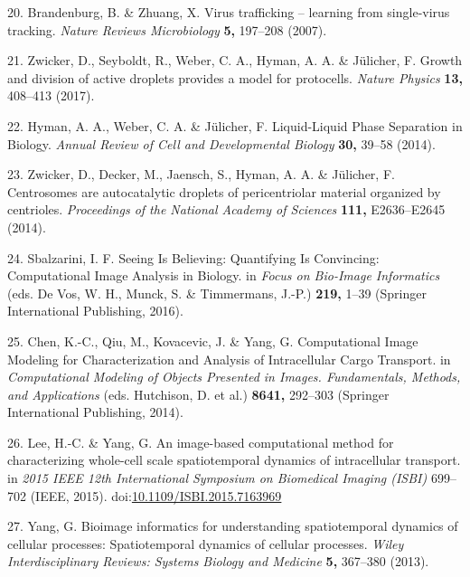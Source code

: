 \documentclass{Dissertate}
\begin{document}
\leavevmode\hypertarget{ref-brandenburg_virus_2007}{}%
20. Brandenburg, B. \& Zhuang, X. Virus trafficking -- learning from
single-virus tracking. \emph{Nature Reviews Microbiology} \textbf{5,}
197--208 (2007).

\leavevmode\hypertarget{ref-zwicker_growth_2017}{}%
21. Zwicker, D., Seyboldt, R., Weber, C. A., Hyman, A. A. \& Jülicher,
F. Growth and division of active droplets provides a model for
protocells. \emph{Nature Physics} \textbf{13,} 408--413 (2017).

\leavevmode\hypertarget{ref-hyman_liquid-liquid_2014}{}%
22. Hyman, A. A., Weber, C. A. \& Jülicher, F. Liquid-Liquid Phase
Separation in Biology. \emph{Annual Review of Cell and Developmental
Biology} \textbf{30,} 39--58 (2014).

\leavevmode\hypertarget{ref-zwicker_centrosomes_2014}{}%
23. Zwicker, D., Decker, M., Jaensch, S., Hyman, A. A. \& Jülicher, F.
Centrosomes are autocatalytic droplets of pericentriolar material
organized by centrioles. \emph{Proceedings of the National Academy of
Sciences} \textbf{111,} E2636--E2645 (2014).

\leavevmode\hypertarget{ref-de_vos_seeing_2016}{}%
24. Sbalzarini, I. F. Seeing Is Believing: Quantifying Is Convincing:
Computational Image Analysis in Biology. in \emph{Focus on Bio-Image
Informatics} (eds. De Vos, W. H., Munck, S. \& Timmermans, J.-P.)
\textbf{219,} 1--39 (Springer International Publishing, 2016).

\leavevmode\hypertarget{ref-hutchison_computational_2014}{}%
25. Chen, K.-C., Qiu, M., Kovacevic, J. \& Yang, G. Computational Image
Modeling for Characterization and Analysis of Intracellular Cargo
Transport. in \emph{Computational Modeling of Objects Presented in
Images. Fundamentals, Methods, and Applications} (eds. Hutchison, D. et
al.) \textbf{8641,} 292--303 (Springer International Publishing, 2014).

\leavevmode\hypertarget{ref-lee_image-based_2015}{}%
26. Lee, H.-C. \& Yang, G. An image-based computational method for
characterizing whole-cell scale spatiotemporal dynamics of intracellular
transport. in \emph{2015 IEEE 12th International Symposium on Biomedical
Imaging (ISBI)} 699--702 (IEEE, 2015).
doi:\href{https://doi.org/10.1109/ISBI.2015.7163969}{10.1109/ISBI.2015.7163969}

\leavevmode\hypertarget{ref-yang_bioimage_2013}{}%
27. Yang, G. Bioimage informatics for understanding spatiotemporal
dynamics of cellular processes: Spatiotemporal dynamics of cellular
processes. \emph{Wiley Interdisciplinary Reviews: Systems Biology and
Medicine} \textbf{5,} 367--380 (2013).
\end{document}
